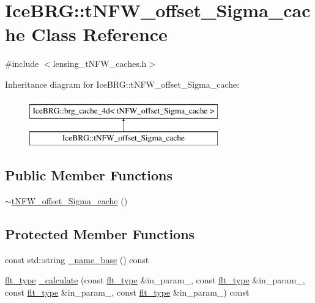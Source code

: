 \hypertarget{classIceBRG_1_1tNFW__offset__Sigma__cache}{}\section{Ice\+B\+R\+G\+:\+:t\+N\+F\+W\+\_\+offset\+\_\+\+Sigma\+\_\+cache Class Reference}
\label{classIceBRG_1_1tNFW__offset__Sigma__cache}


{\ttfamily \#include $<$lensing\+\_\+t\+N\+F\+W\+\_\+caches.\+h$>$}

Inheritance diagram for Ice\+B\+R\+G\+:\+:t\+N\+F\+W\+\_\+offset\+\_\+\+Sigma\+\_\+cache\+:\begin{figure}[H]
\begin{center}
\leavevmode
\includegraphics[height=2.000000cm]{classIceBRG_1_1tNFW__offset__Sigma__cache}
\end{center}
\end{figure}
\subsection*{Public Member Functions}
\begin{DoxyCompactItemize}
\item 
\hyperlink{classIceBRG_1_1tNFW__offset__Sigma__cache_a13dd2428c8cf0b54f1b97aea7e5edb63}{$\sim$t\+N\+F\+W\+\_\+offset\+\_\+\+Sigma\+\_\+cache} ()
\end{DoxyCompactItemize}
\subsection*{Protected Member Functions}
\begin{DoxyCompactItemize}
\item 
const std\+::string \hyperlink{classIceBRG_1_1tNFW__offset__Sigma__cache_a8880eaf40b9befee40ad062029d90766}{\+\_\+name\+\_\+base} () const 
\item 
\hyperlink{lib_2IceBRG__main_2common_8h_ad0f130a56eeb944d9ef2692ee881ecc4}{flt\+\_\+type} \hyperlink{classIceBRG_1_1tNFW__offset__Sigma__cache_ad21361cf013e2da85ac26a85af773b94}{\+\_\+calculate} (const \hyperlink{lib_2IceBRG__main_2common_8h_ad0f130a56eeb944d9ef2692ee881ecc4}{flt\+\_\+type} \&in\+\_\+param\+\_, const \hyperlink{lib_2IceBRG__main_2common_8h_ad0f130a56eeb944d9ef2692ee881ecc4}{flt\+\_\+type} \&in\+\_\+param\+\_, const \hyperlink{lib_2IceBRG__main_2common_8h_ad0f130a56eeb944d9ef2692ee881ecc4}{flt\+\_\+type} \&in\+\_\+param\+\_, const \hyperlink{lib_2IceBRG__main_2common_8h_ad0f130a56eeb944d9ef2692ee881ecc4}{flt\+\_\+type} \&in\+\_\+param\+\_) const 
\end{DoxyCompactItemize}
